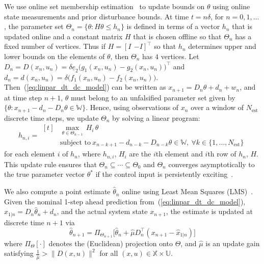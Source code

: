 \documentclass[final,5p,times,twocolumn,authoryear]{elsarticle}
\def\X{\mathbb{X}}
\def\U{\mathbb{U}}
\def\W{\mathbb{W}}
\begin{document}
We use online set membership estimation~\citep{lor19:auto,lu21:ijrnc} to update bounds on $\theta$ using online state measurements and prior disturbance bounds.
%
At time $t=n\delta$, for $n=0,1,\ldots$, the parameter set $\Theta_n = \{\theta : H \theta \leq h_n\}$ is defined in terms of a vector $h_n$ that is updated online and a constant matrix $H$ that is chosen offline so that $\Theta_n$ has a fixed
number of vertices. 
Thus if $H = [I \ \, {-I}]^\top$ so that $h_n$ determines upper and lower bounds on the elements of $\theta$, then $\Theta_n$ has $4$ vertices.
%
Let $D_n = D(x_n,u_n) = \delta \underline{e}_2 \bigl( g_1(x_n,u_n) - g_2 (x_n, u_n)\bigr)^\top$ and $d_n = d(x_n,u_n) = \delta \bigl( f_1(x_n,u_n) - f_2 (x_n, u_n)\bigr)$.
%
Then~(\ref{eq:linpar_dt_dc_model}) can be written as $x_{n+1} = D_n \theta + d_n + w_n$, and at time step $n+1$, $\theta$ must belong to an unfalsified parameter set given by
$\{\theta :  x_{n+1} - d_n - D_n \theta \in \W\}$.
Hence, using observations of $x_n$ over a window of $N_{\mathrm{est}}$ discrete time steps, we update $\Theta_n$ by solving a linear program:
\[
  h_{n,i} =   \begin{aligned}[t] & \max_{\theta\in\Theta_{n-1}} \, H_i \, \theta 
  \\
  & \text{subject to} \ x_{n-k+1} - d_{n-k} - D_{n-k}\theta \in \W, \ \forall k \in\{1,\ldots,N_{\mathrm{est}}\}
  \end{aligned}
\]
for each element $i$ of $h_n$, where $h_{n,i}$, $H_i$ are the $i$th element and $i$th row of $h_n$, $H$. This update rule ensures that $\Theta_n\subseteq \cdots \subseteq \Theta_0$ and $\Theta_n$ converges asymptotically to the true parameter vector $\theta^\ast$ if the control input is persistently exciting~\citep{lu21:ijrnc}.

We also compute  a point estimate $\hat{\theta}_n$ online using Least Mean Squares (LMS)~\citep{lor19:auto}.
%
Given the nominal 1-step ahead prediction from~(\ref{eq:linpar_dt_dc_model}),
$\hat{x}_{1|n} = D_n\hat{\theta}_n + d_n$,
and the actual system state $x_{n+1}$, the estimate is updated at discrete time $n+1$ via
\[
\hat{\theta}_{n+1} = \Pi_{\Theta_{n+1}}\bigl[ \hat{\theta}_n + \hat{\mu} D_n^\top (x_{n+1} - \hat{x}_{1|n}) \bigr] 
\]
where $\Pi_\Theta[\cdot]$ denotes the (Euclidean) projection onto $\Theta$, and $\hat{\mu}$ is an update gain satisfying $\tfrac{1}{\hat{\mu}} > \| D(x,u) \|^2$ for all $(x,u)\in\X\times\U$.
\end{document}
